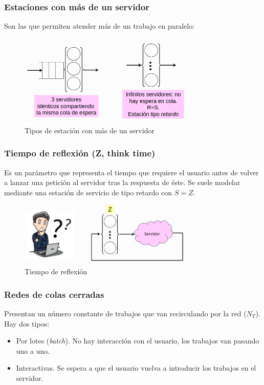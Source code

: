 \documentclass[12pt,spanish]{article}
\begin{document}
\subsubsection{Estaciones con más de un servidor}

Son las que permiten atender más de un trabajo en paralelo:

\begin{figure}[H]
	\centering
	\includegraphics[width=0.75\textwidth]{estpar.png}
	\caption{Tipos de estación con más de un servidor}
\end{figure}

\subsubsection{Tiempo de reflexión (Z, think time)}

Es un parámetro que representa el tiempo que requiere el usuario antes de volver a lanzar una petición al servidor tras la respuesta de éste. Se suele modelar mediante una estación de servicio de tipo retardo con $S=Z$.

\begin{figure}[H]
	\centering
	\includegraphics[width=0.75\textwidth]{thinktime.png}
	\caption{Tiempo de reflexión}
\end{figure}

\subsubsection{Redes de colas cerradas}

Presentan un número constante de trabajos que van recirculando por la red ($N_T$). Hay dos tipos:
\begin{itemize}
	\item Por lotes (\textit{batch}). No hay interacción con el usuario, los trabajos van pasando uno a uno.
	\item Interactivas. Se espera a que el usuario vuelva a introducir los trabajos en el servidor.
\end{itemize}
\end{document}
